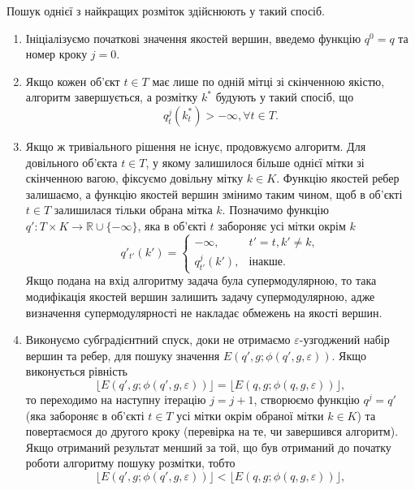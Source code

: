 Пошук однієї з найкращих розміток здійснюють у такий спосіб.
\begin{enumerate}
    \item Ініціалізуємо початкові значення якостей вершин, введемо функцію $q^0=q$ та номер кроку $j=0$.
    \item Якщо кожен об'єкт $t\in T$ має лише по одній мітці зі скінченною якістю, алгоритм завершується, 
    а розмітку $k^*$ будують у такий спосіб, що
    \begin{equation}
        q^j_t(k^*_t)>-\infty, \forall t\in T.
    \end{equation}
    \item Якщо ж тривіального рішення не існує, продовжуємо алгоритм. Для довільного
    об'єкта $t\in T$, у якому залишилося більше однієї мітки зі скінченною вагою, фіксуємо довільну мітку $k\in K$.
    Функцію якостей ребер залишаємо, а функцію якостей вершин змінимо таким чином, щоб в об'єкті $t\in T$ залишилася тільки 
    обрана мітка $k$. Позначимо функцію $q':T\times K\rightarrow\mathbb{R}\cup\{-\infty\}$, 
    яка в об'єкті $t$ забороняє усі мітки окрім $k$
    \begin{equation}
        q'_{t'}(k') =
        \begin{cases}
            -\infty, & t'=t, k' \neq k,\\
            q^j_{t'}(k'), & \text{інакше.}
        \end{cases}
    \end{equation}
    Якщо подана на вхід алгоритму задача була супермодулярною, то така модифікація якостей вершин
    залишить задачу супермодулярною, адже визначення супермодулярності не накладає обмежень на якості вершин.
    \item Виконуємо субградієнтний спуск, доки не отримаємо $\varepsilon$-узгоджений 
    набір вершин та ребер, для пошуку значення $E(q',g;\phi(q',g,\varepsilon))$. Якщо виконується рівність
    \begin{equation}
        \lfloor E(q',g;\phi(q',g,\varepsilon))\rfloor = \lfloor E(q,g;\phi(q,g,\varepsilon))\rfloor, 
    \end{equation}
    то переходимо на наступну ітерацію $j=j+1$, створюємо функцію $q^j=q'$ (яка 
    забороняє в об'єкті $t\in T$ усі мітки окрім обраної мітки $k\in K$) та повертаємося до другого кроку
    (перевірка на те, чи завершився алгоритм). Якщо отриманий результат менший за той, що був отриманий до початку 
    роботи алгоритму пошуку розмітки, тобто
    \begin{equation}
        \lfloor E(q',g;\phi(q',g,\varepsilon))\rfloor < \lfloor E(q,g;\phi(q,g,\varepsilon))\rfloor, 

\end{equation}
\end{enumerate}
